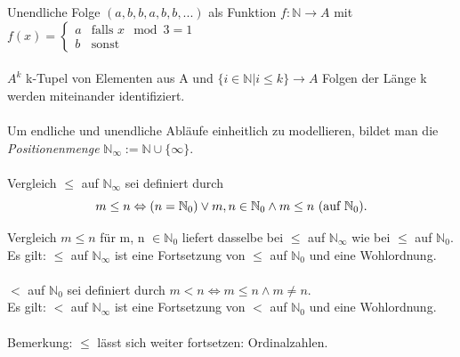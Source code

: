 Unendliche Folge $ (a, b, b, a, b, b, ...) $ als Funktion $ f: \mathbb{N} \rightarrow A $ mit $ f(x) = \begin{cases} a & \text{falls } x \mod 3 = 1\\ b & \text{sonst}\end{cases} $\\
\\
$A^k$ k-Tupel von Elementen aus A und $\{i \in \mathbb{N} | i \leq k\} \rightarrow A$ Folgen der Länge k werden miteinander identifiziert.\\
\\
Um endliche und unendliche Abläufe einheitlich zu modellieren, bildet man die \emph{Positionenmenge} $\mathbb{N}_\infty := \mathbb{N} \cup \{\infty\}$.\\
\\
Vergleich $\leq$ auf $\mathbb{N}_\infty$ sei definiert durch
\begin{equation*}
m \leq n \Leftrightarrow (n = \mathbb{N}_0) \lor  m, n \in \mathbb{N}_0 \land m \leq n \text{ (auf } \mathbb{N}_0 \text{)}.\\
\end{equation*}

Vergleich $m \leq n$ für m, n $\in \mathbb{N}_0$ liefert dasselbe bei $\leq$ auf $\mathbb{N}_\infty$ wie bei $\leq$ auf $\mathbb{N}_0$.
\\
Es gilt: $\leq$ auf $\mathbb{N}_\infty$ ist eine Fortsetzung von $\leq$ auf $\mathbb{N}_0$ und eine Wohlordnung.\\
\\
$<$ auf $\mathbb{N}_0$ sei definiert durch $m < n \Leftrightarrow m \leq n \land m \neq n$.\\
Es gilt: $<$ auf $\mathbb{N}_\infty$ ist eine Fortsetzung von $<$ auf $\mathbb{N}_0$ und eine Wohlordnung.\\
\\
Bemerkung: $\leq$ lässt sich weiter fortsetzen: Ordinalzahlen.\\
\\

